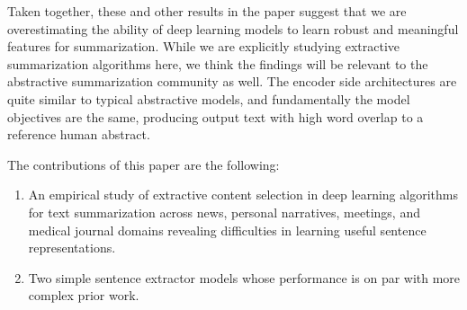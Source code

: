 %
%


Taken together, these and other results in the paper suggest that we are 
overestimating the ability of deep learning models to learn robust and 
meaningful features for summarization. 
While we are explicitly studying extractive summarization algorithms here,
we think the findings will be relevant to the abstractive summarization 
community as well. The encoder side architectures are quite similar to
typical abstractive models, and fundamentally the model objectives are 
the same, producing output text with high word overlap to a reference human
abstract. 

The contributions of this paper are the following:
\begin{enumerate}
    \item An empirical study of extractive content selection in 
        deep learning 
        algorithms for text summarization across news, personal narratives, 
         meetings, and
         medical journal domains revealing difficulties in learning
         useful sentence representations.

    \item Two simple sentence extractor models whose performance is 
          on par 
          with more complex prior work.
\end{enumerate}

